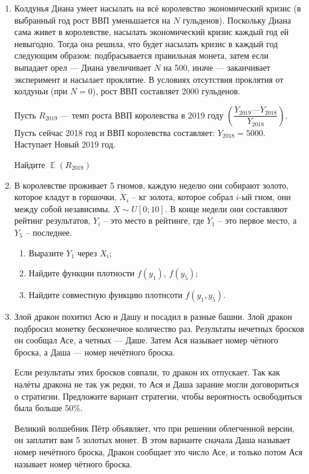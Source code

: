 \documentclass[a4paper,12pt]{article}
\DeclareMathOperator{\E}{\mathbb{E}}
\begin{document}
\begin{enumerate}
\item

 Колдунья Диана умеет насылать на всё королевство экономический кризис (в выбранный год рост ВВП уменьшается на $N$ гульденов). Поскольку Диана сама живет в королевстве, насылать экономический кризис каждый год ей невыгодно. Тогда она решила, что будет насылать кризис в каждый год следующим образом: подбрасывается правильная монета, затем если выпадает орел — Диана увеличивает $N$ на 500, иначе — заканчивает эксперимент и насылает проклятие. В условиях отсутствия проклятия от колдуньи (при $N = 0$), рост ВВП составляет 2000 гульденов.

Пусть $R_{2019}$ — темп роста ВВП королевства в 2019 году $\left( \dfrac{Y_{2019} — Y_{2018}}{Y_{2018}} \right).$ Пусть сейчас 2018 год и ВВП королевства составляет: $Y_{2018} = 5000$. Наступает Новый 2019 год.

Найдите $\E(R_{2019})$
\item
В королевстве проживает 5 гномов, каждую неделю они собирают золото, которое кладут в горшочки, $X_i$ – кг золота, которое собрал $i$-ый гном, они между собой независимы. $X\sim U[0;10]$. В конце недели они составляют рейтинг результатов, $Y_i$ – это место в рейтинге, где $Y_1$ – это первое место, а $Y_5$ – последнее.
\begin{enumerate}
\item Выразите $Y_1$ через $X_i$;
\item Найдите функции плотности $f(y_1)$, $f(y_5)$;
\item Найдите совместную функцию плотнсоти $f(y_1, y_5)$.
\end{enumerate}

\item

 Злой дракон похитил Асю и Дашу и посадил в разные башни. Злой дракон подбросил монетку бесконечное количество раз. Результаты нечетных бросков он сообщал Асе, а четных — Даше.  Затем Ася называет номер чётного броска, а Даша — номер нечётного броска.

 Если результаты этих бросков совпали, то дракон их отпускает. Так как налёты дракона не так уж редки, то Ася и Даша зарание могли договориться о стратигии.  Предложите вариант стратегии, чтобы вероятность освободиться была больше 50\%.

 Великий волшебник Пётр объявляет, что при решении облегченной версии, он заплатит вам 5 золотых монет. В этом варианте сначала Даша называет номер нечётного броска, Дракон сообщает это число Асе, и только потом Ася называет номер чётного броска.
\end{enumerate}
\end{document}
